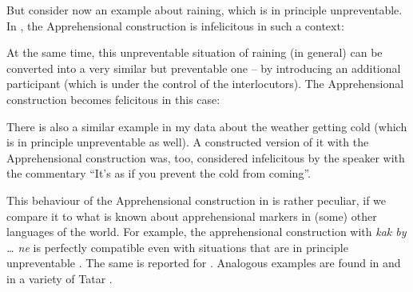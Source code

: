 \documentclass[output=paper,colorlinks,citecolor=brown]{langscibook}
\begin{document}
But consider now an example about raining, which is in principle unpreventable. In , the Apprehensional construction is infelicitous in such a context:

\z

 At the same time, this unpreventable situation of raining (in general) can be converted into a very similar but preventable one -- by introducing an additional participant (which is under the control of the interlocutors). The Apprehensional construction becomes felicitous in this case:

\z

There is also a similar example in my data about the weather getting cold (which is in principle unpreventable as well). A constructed version of it with the Apprehensional construction was, too, considered infelicitous by the speaker with the commentary ``It's as if you prevent the cold from coming''.

This behaviour of the Apprehensional construction in  is rather peculiar, if we compare it to what is known about apprehensional markers in (some) other languages of the world. For example, the  apprehensional construction with \textit{kak by {\dots} ne} is perfectly compatible even with situations that are in principle unpreventable . The same is reported for  \citep[274]{vuillermet2018}. Analogous examples are found in   and in a variety of Tatar .
\end{document}
